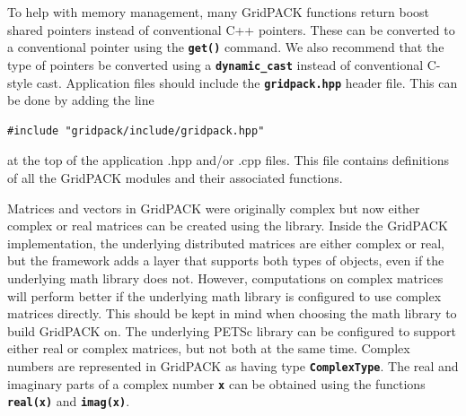 To help with memory management, many GridPACK functions return boost shared pointers instead of conventional C++ pointers. These can be converted to a conventional pointer using the \texttt{\textbf{get()}} command. We also recommend that the type of pointers be converted using a \texttt{\textbf{dynamic\_cast}} instead of conventional C-style cast.
Application files should include the \texttt{\textbf{gridpack.hpp}} header file. This can be done by adding the line

{
\color{red}
\begin{Verbatim}[fontseries=b]
    #include "gridpack/include/gridpack.hpp"
\end{Verbatim}
}

at the top of the application .hpp and/or .cpp files. This file contains definitions of all the GridPACK modules and their associated functions.

Matrices and vectors in GridPACK were originally complex but now either complex
or real matrices can be created using the library. Inside the GridPACK
implementation, the underlying distributed matrices are either complex or real,
but the framework adds a layer that supports both types of objects, even if the
underlying math library does not. However, computations on complex matrices will
perform better if the underlying math library is configured to use complex
matrices directly. This should be kept in mind when choosing the math library to
build GridPACK on. The underlying PETSc library can be configured to support
either real or complex matrices, but not both at the same time. Complex numbers are represented in GridPACK as having type \texttt{\textbf{ComplexType}}. The real and imaginary parts of a complex number \texttt{\textbf{x}} can be obtained using the functions \texttt{\textbf{real(x)}} and \texttt{\textbf{imag(x)}}.
\newline
\hyperlink{topDoc}{\color{blue}{Top}}
